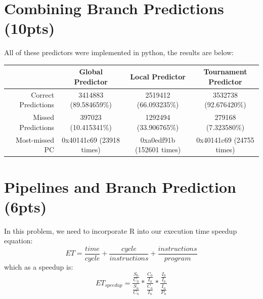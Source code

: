\documentclass{article}
\begin{document}
\section{Combining Branch Predictions (10pts)}
All of these predictors were implemented in python, the results are below:
{\footnotesize
\begin{tabular}{| r | c | c | c |}
\hline
   & \bf{Global Predictor} & \bf{Local Predictor} & \bf{Tournament Predictor} \\\hline
Correct Predictions 	& 3414883 (89.584659\%)		& 2519412 (66.093235\%)		& 3532738 (92.676420\%) \\\hline
Missed Predictions 	& 397023 (10.415341\%)		& 1292494 (33.906765\%)		& 279168 (7.323580\%) \\\hline
Most-missed PC 	& 0x40141c69 (23918 times)	& 0xa0edf91b (152601 times)	& 0x40141c69 (24755 times)\\
\hline
\end{tabular}
}

\newpage

\section{Pipelines and Branch Prediction (6pts)}
In this problem, we need to incorporate R into our execution time speedup equation:
\begin{equation*}
ET = \frac{time}{cycle} + \frac{cycle}{instructions} + \frac{instructions}{program}
\end{equation*}
which as a speedup is:
\begin{equation*}
ET_{speedup} = \frac{\frac{S_0}{C_0}}{\frac{S_n}{C_n}} * \frac{\frac{C_0}{I_0}}{\frac{C_n}{I_n}} * \frac{\frac{I_0}{I_0}}{\frac{I_n}{P_n}}
\end{equation*}
\end{document}
